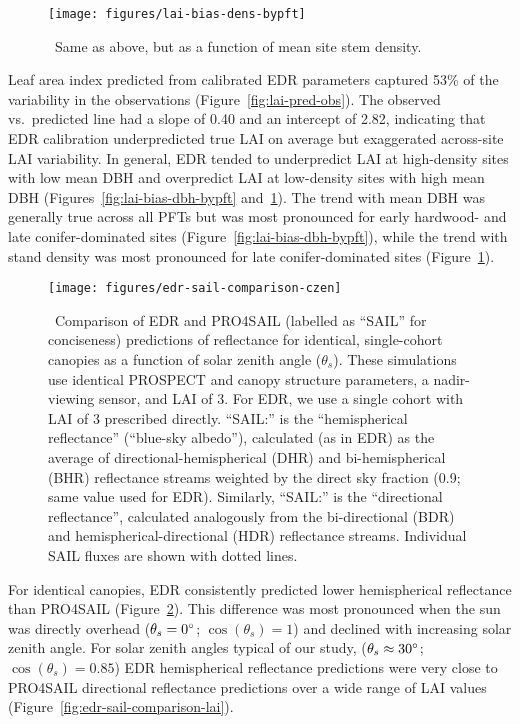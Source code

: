 \begin{figure}
  \centering
  \texttt{[image: figures/lai-bias-dens-bypft]}
  \caption{\
    Same as above, but as a function of mean site stem density.
  }\label{fig:lai-bias-dens-bypft}
\end{figure}

Leaf area index predicted from calibrated EDR parameters captured 53\% of the variability in the observations (Figure~\ref{fig:lai-pred-obs}).
The observed vs.\ predicted line had a slope of 0.40 and an intercept of 2.82, indicating that EDR calibration underpredicted true LAI on average but exaggerated across-site LAI variability.
In general, EDR tended to underpredict LAI at high-density sites with low mean DBH and overpredict LAI at low-density sites with high mean DBH (Figures~\ref{fig:lai-bias-dbh-bypft} and~\ref{fig:lai-bias-dens-bypft}).
The trend with mean DBH was generally true across all PFTs but was most pronounced for early hardwood- and late conifer-dominated sites (Figure~\ref{fig:lai-bias-dbh-bypft}),
while the trend with stand density was most pronounced for late conifer-dominated sites (Figure~\ref{fig:lai-bias-dens-bypft}).

\begin{figure}
  \centering
  \texttt{[image: figures/edr-sail-comparison-czen]}
  \caption{\label{fig:edr-sail-comparison-czen}\
    Comparison of EDR and PRO4SAIL (labelled as ``SAIL'' for conciseness) predictions of reflectance for identical, single-cohort canopies as a function of solar zenith angle ($\theta_{s}$).
    These simulations use identical PROSPECT and canopy structure parameters, a nadir-viewing sensor, and LAI of 3.
    For EDR, we use a single cohort with LAI of 3 prescribed directly.\@
    ``SAIL:\@HR'' is the ``hemispherical reflectance'' (``blue-sky albedo''), calculated (as in EDR) as the average of directional-hemispherical (DHR) and bi-hemispherical (BHR) reflectance streams weighted by the direct sky fraction (0.9; same value used for EDR).
    Similarly, ``SAIL:\@DR'' is the ``directional reflectance'', calculated analogously from the bi-directional (BDR) and hemispherical-directional (HDR) reflectance streams.
    Individual SAIL fluxes are shown with dotted lines.
  }
\end{figure}

For identical canopies, EDR consistently predicted lower hemispherical reflectance than PRO4SAIL (Figure~\ref{fig:edr-sail-comparison-czen}).
This difference was most pronounced when the sun was directly overhead ($\theta_{s} = 0^{\circ}$; $\cos(\theta_{s}) = 1$) and declined with increasing solar zenith angle.
For solar zenith angles typical of our study, ($\theta_{s} \approx 30^{\circ}$; $\cos(\theta_{s}) = 0.85$) EDR hemispherical reflectance predictions were very close to PRO4SAIL directional reflectance predictions over a wide range of LAI values (Figure~\ref{fig:edr-sail-comparison-lai}).
